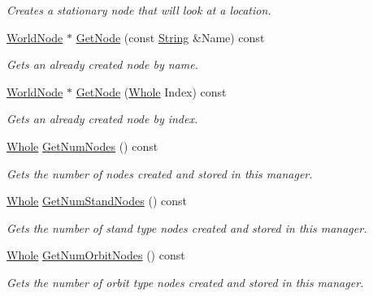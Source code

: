 \begin{DoxyCompactItemize}
\begin{DoxyCompactList}\small\item\em Creates a stationary node that will look at a location. \item\end{DoxyCompactList}\item 
\hyperlink{classphys_1_1WorldNode}{WorldNode} $\ast$ \hyperlink{classphys_1_1SceneManager_a30fb2074edc5191826aa2b0fb4d943a6}{GetNode} (const \hyperlink{namespacephys_aa03900411993de7fbfec4789bc1d392e}{String} \&Name) const 
\begin{DoxyCompactList}\small\item\em Gets an already created node by name. \item\end{DoxyCompactList}\item 
\hyperlink{classphys_1_1WorldNode}{WorldNode} $\ast$ \hyperlink{classphys_1_1SceneManager_ad7359bdccd992f34fff901b213825db6}{GetNode} (\hyperlink{namespacephys_a460f6bc24c8dd347b05e0366ae34f34a}{Whole} Index) const 
\begin{DoxyCompactList}\small\item\em Gets an already created node by index. \item\end{DoxyCompactList}\item 
\hyperlink{namespacephys_a460f6bc24c8dd347b05e0366ae34f34a}{Whole} \hyperlink{classphys_1_1SceneManager_a6ba57b9db1a1bfe2471425d6d8341272}{GetNumNodes} () const 
\begin{DoxyCompactList}\small\item\em Gets the number of nodes created and stored in this manager. \item\end{DoxyCompactList}\item 
\hyperlink{namespacephys_a460f6bc24c8dd347b05e0366ae34f34a}{Whole} \hyperlink{classphys_1_1SceneManager_ab80f76686a3cbf2c2ec49ae7eadf8c95}{GetNumStandNodes} () const 
\begin{DoxyCompactList}\small\item\em Gets the number of stand type nodes created and stored in this manager. \item\end{DoxyCompactList}\item 
\hyperlink{namespacephys_a460f6bc24c8dd347b05e0366ae34f34a}{Whole} \hyperlink{classphys_1_1SceneManager_ac54e082885d9df328aab3f8bcfaaaad2}{GetNumOrbitNodes} () const 
\begin{DoxyCompactList}\small\item\em Gets the number of orbit type nodes created and stored in this manager. \item\end{DoxyCompactList}\item 

\end{DoxyCompactItemize}
